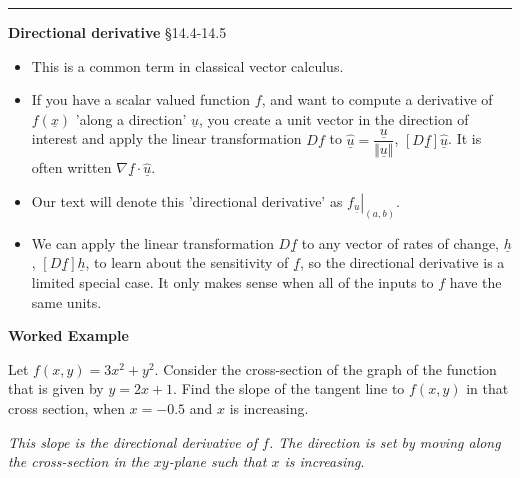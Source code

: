 \documentclass[12pt,letterpaper,noanswers]{exam}
\newcommand{\mb}[1]{\underline{#1}}
\begin{document}
\vspace{0.2cm}
\hrule
\vspace{0.2cm}


\noindent\textbf{Directional derivative} \S 14.4-14.5

\begin{tcolorbox}
\begin{itemize}
\itemsep0em
    \item This is a common term in classical vector calculus.
    \item If you have a scalar valued function $f$, and want to compute a derivative of $f(\mb{x})$ 'along a direction' $\mb{u}$, you create a unit vector in the direction of interest and apply the linear transformation $Df$ to $\hat{\mb{u}} = \dfrac{\mb{u}}{\Vert\mb{u}\Vert}$, $[D\mb{f}]\hat{\mb{u}}$.  It is often written $\nabla \mb{f} \cdot \hat{\mb{u}}.$
    \item Our text will denote this 'directional derivative' as $\left.f_{\mb{ u}}\right\vert_{(a,b)}$.
    \item We can apply the linear transformation $D\mb{f}$ to any vector of rates of change, $\mb{h}$, $[D\mb{f}]\mb{h}$, to learn about the sensitivity of $\mb{f}$, so the directional derivative is a limited special case.  It only makes sense when all of the inputs to $f$ have the same units.
\end{itemize}
\end{tcolorbox}

\noindent\textbf{Worked Example}

Let $f(x,y) = 3x^2+y^2$.  Consider the cross-section of the graph of the function that is given by $y = 2x + 1$.  Find the slope of the tangent line to $f(x,y)$ in that cross section, when $x = -0.5$ and $x$ is increasing.  

\emph{This slope is the directional derivative of $f$.  The direction is set by moving along the cross-section in the $xy$-plane such that $x$ is increasing}.
\end{document}
